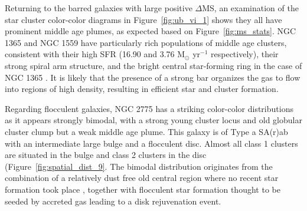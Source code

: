 
 Returning to the barred galaxies with large positive $\Delta$MS, an examination of the star cluster color-color diagrams in Figure~\ref{fig:ub_vi_1} shows they all have prominent middle age plumes, as expected based on Figure~\ref{fig:ms_stats}. NGC 1365 and NGC 1559 have particularly rich populations of middle age clusters, consistent with their high SFR (16.90 and 3.76 M$_{\odot}$ yr$^{-1}$ respectively), their strong spiral arm structure, and the bright central star-forming ring in the case of NGC 1365 \citep{whitmore_phangs-jwst_2023}.
It is likely that the presence of a strong bar organizes the gas to flow into regions of high density, resulting in efficient star and cluster formation.



Regarding flocculent galaxies, NGC 2775 has a striking color-color distributions as it appears strongly bimodal, with a strong young cluster locus and old globular cluster clump but a weak middle age plume. This galaxy is of Type a SA(r)ab with an intermediate large bulge and a flocculent disc. Almost all class 1 clusters are situated in the bulge and class 2 clusters in the disc (Figure~\ref{fig:spatial_dist_9}. The bimodal distribution originates from the combination of a relatively dust free old central region where no recent star formation took place \citep{hogg_hot_2001}, together with flocculent star formation thought to be seeded by accreted gas \citep[i.e., from the nearby companion NGC\,2777,][]{arp_properties_1991} leading to a disk rejuvenation event. %

